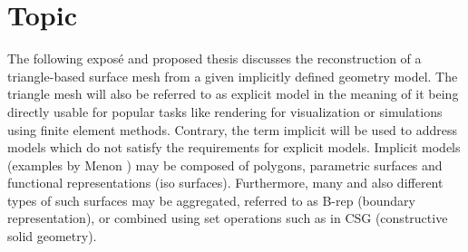 
\section{Topic}

The following exposé and proposed thesis discusses the reconstruction of a triangle-based surface mesh from a given implicitly defined geometry model. The triangle mesh will also be referred to as explicit model in the meaning of it being directly usable for popular tasks like rendering for visualization or simulations using finite element methods. Contrary, the term implicit will be used to address models which do not satisfy the requirements for explicit models. Implicit models (\cf examples by Menon \cite{implicit_techniques}) may be composed of polygons, parametric surfaces and functional representations (iso surfaces). Furthermore, many and also different types of such surfaces may be aggregated, referred to as B-rep (boundary representation), or combined using set operations such as in CSG (constructive solid geometry).
